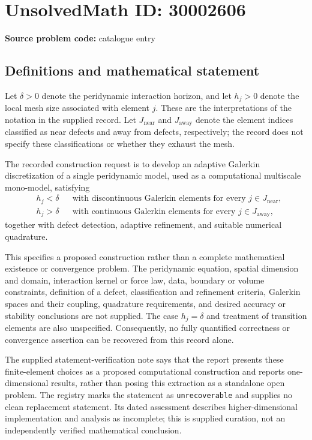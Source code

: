 \documentclass[11pt]{article}
\begin{document}
\section*{UnsolvedMath ID: 30002606}
\textbf{Source problem code:} catalogue entry
\subsection{Definitions and mathematical statement}
Let \(\delta>0\) denote the peridynamic interaction horizon, and let \(h_j>0\) denote the local mesh size associated with element \(j\). These are the interpretations of the notation in the supplied record. Let \(J_{\mathrm{near}}\) and \(J_{\mathrm{away}}\) denote the element indices classified as near defects and away from defects, respectively; the record does not specify these classifications or whether they exhaust the mesh.

The recorded construction request is to develop an adaptive Galerkin discretization of a single peridynamic model, used as a computational multiscale mono-model, satisfying
\[
\begin{aligned}
&h_j<\delta &&\text{with discontinuous Galerkin elements for every }j\in J_{\mathrm{near}},\\
&h_j>\delta &&\text{with continuous Galerkin elements for every }j\in J_{\mathrm{away}},
\end{aligned}
\]
together with defect detection, adaptive refinement, and suitable numerical quadrature.

This specifies a proposed construction rather than a complete mathematical existence or convergence problem. The peridynamic equation, spatial dimension and domain, interaction kernel or force law, data, boundary or volume constraints, definition of a defect, classification and refinement criteria, Galerkin spaces and their coupling, quadrature requirements, and desired accuracy or stability conclusions are not supplied. The case \(h_j=\delta\) and treatment of transition elements are also unspecified. Consequently, no fully quantified correctness or convergence assertion can be recovered from this record alone.

The supplied statement-verification note says that the report presents these finite-element choices as a proposed computational construction and reports one-dimensional results, rather than posing this extraction as a standalone open problem. The registry marks the statement as \texttt{unrecoverable} and supplies no clean replacement statement. Its dated assessment describes higher-dimensional implementation and analysis as incomplete; this is supplied curation, not an independently verified mathematical conclusion.
\end{document}
